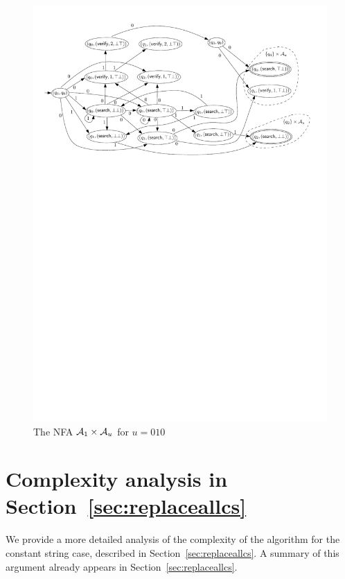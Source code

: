 \begin{figure}[htbp]
\begin{center}
\includegraphics[scale=0.65]{constant-string-example.pdf}
\end{center}
\caption{The NFA $\mathcal{A}_1 \times \mathcal{A}_u$ for $u = 010$}\label{fig-cs-exmp}
\end{figure}
%

\def\refsecreplaceallcs{\ref{sec:replaceallcs}}
\section{Complexity analysis in Section~\protect\refsecreplaceallcs}
\label{sec:cs-complexity-full}

We provide a more detailed analysis of the complexity of the algorithm for the constant string case, described in Section~\ref{sec:replaceallcs}.
A summary of this argument already appears in Section~\ref{sec:replaceallcs}.

